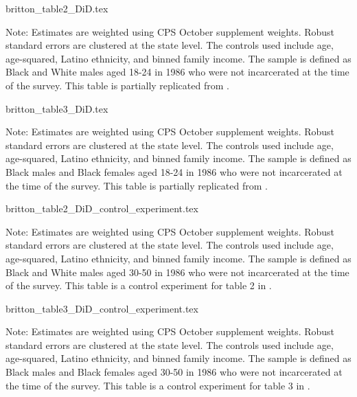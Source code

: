 \clearpage



{britton_table2_DiD.tex}
\begin{footnotesize}
  \noindent Note: Estimates are weighted using CPS October supplement weights. Robust standard errors are clustered at the state level. The controls used include age, age-squared, Latino ethnicity, and binned family income. The sample is defined as Black and White males aged 18-24 in 1986 who were not incarcerated at the time of the survey.
  This table is partially replicated from \cite{britton2022}.
\end{footnotesize}

{britton_table3_DiD.tex}
\begin{footnotesize}
  \noindent Note: Estimates are weighted using CPS October supplement weights. Robust standard errors are clustered at the state level. The controls used include age, age-squared, Latino ethnicity, and binned family income. The sample is defined as Black males and Black females aged 18-24 in 1986 who were not incarcerated at the time of the survey. This table is partially replicated from \cite{britton2022}.
\end{footnotesize}

\clearpage

{britton_table2_DiD_control_experiment.tex}
\begin{footnotesize}
  \noindent Note: Estimates are weighted using CPS October supplement weights. Robust standard errors are clustered at the state level. The controls used include age, age-squared, Latino ethnicity, and binned family income. The sample is defined as Black and White males aged 30-50 in 1986 who were not incarcerated at the time of the survey.
  This table is a control experiment for table 2 in \cite{britton2022}.
\end{footnotesize}

{britton_table3_DiD_control_experiment.tex}
\begin{footnotesize}
  \noindent Note: Estimates are weighted using CPS October supplement weights. Robust standard errors are clustered at the state level. The controls used include age, age-squared, Latino ethnicity, and binned family income. The sample is defined as Black males and Black females aged 30-50 in 1986 who were not incarcerated at the time of the survey.
  This table is a control experiment for table 3 in \cite{britton2022}.
\end{footnotesize}
\clearpage

